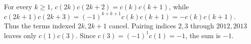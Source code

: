 For every $k\ge1$, $c(2k)c(2k+2)=c(k)c(k+1)$, while $c(2k+1)c(2k+3)=(-1)^{k+k+1}c(k)c(k+1)=-c(k)c(k+1)$. Thus the terms indexed $2k,2k+1$ cancel. Pairing indices $2,3$ through $2012,2013$ leaves only $c(1)c(3)$. Since $c(3)=(-1)^1c(1)=-1$, the sum is $\boxed{-1}$.
